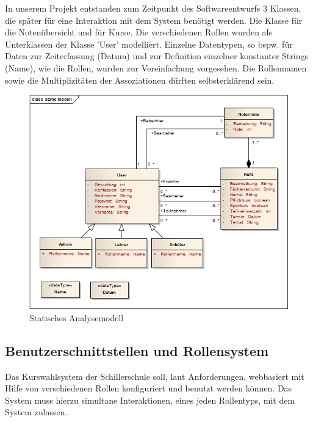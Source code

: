 \documentclass[12pt, twoside, a4paper, ngerman]{article}
\begin{document}
In unserem Projekt entstanden zum Zeitpunkt des Softwareentwurfs 3 Klassen, die später für eine Interaktion mit dem System benötigt werden. Die Klasse für die Notenübersicht und für Kurse. Die verschiedenen Rollen wurden als Unterklassen der Klasse 'User' modelliert. Einzelne Datentypen, so bspw. für Daten zur Zeiterfassung (Datum) und zur Definition einzelner konstanter Strings (Name), wie die Rollen, wurden zur Vereinfachung vorgesehen.
Die Rollennamen sowie die Multiplizitäten der Assoziationen dürften selbsterklärend sein.

\begin{figure}[H]
 \begin{center}
   \includegraphics[scale=0.7]{img/StaticClassModel_kuwasys20.png}
 \end{center}
 \caption[\textbf{Statisches Analysemodell}]{Statisches Analysemodell}
 \label{fig:UML_SA_kuwasys20}
\end{figure}

\subsection{Benutzerschnittstellen und Rollensystem}\label{subsec:Benutzerschnittstellen und Rollensystem}

Das Kurswahlsystem der Schillerschule soll, laut Anforderungen, webbasiert mit Hilfe von verschiedenen Rollen konfiguriert und benutzt werden können.
Das System muss hierzu simultane Interaktionen, eines jeden Rollentyps, mit dem System zulassen. 
\end{document}
